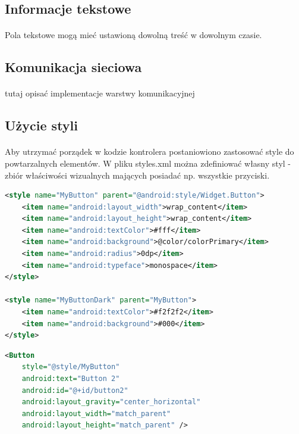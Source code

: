 \subsection{Informacje tekstowe}
\paragraph{}
Pola tekstowe mogą mieć ustawioną dowolną treść w dowolnym czasie.

\subsection{Komunikacja sieciowa}
\paragraph{}
{\color{red}tutaj opisać implementacje warstwy komunikacyjnej}


\subsection{Użycie styli}
\paragraph{}
Aby utrzymać porządek w kodzie kontrolera postaniowiono zastosować style do powtarzalnych elementów. W pliku styles.xml można zdefiniować własny styl - zbiór właściwości wizualnych mających posiadać np. wszystkie przyciski.


\begin{lstlisting}[language=XML]
 <style name="MyButton" parent="@android:style/Widget.Button">
    <item name="android:layout_width">wrap_content</item>
    <item name="android:layout_height">wrap_content</item>
    <item name="android:textColor">#fff</item>
    <item name="android:background">@color/colorPrimary</item>
    <item name="android:radius">0dp</item>
    <item name="android:typeface">monospace</item>
</style>

<style name="MyButtonDark" parent="MyButton">
    <item name="android:textColor">#f2f2f2</item>
    <item name="android:background">#000</item>
</style>
\end{lstlisting}

\begin{lstlisting}[language=XML]
<Button
    style="@style/MyButton"
    android:text="Button 2"
    android:id="@+id/button2"
    android:layout_gravity="center_horizontal"
    android:layout_width="match_parent"
    android:layout_height="match_parent" />
\end{lstlisting}

